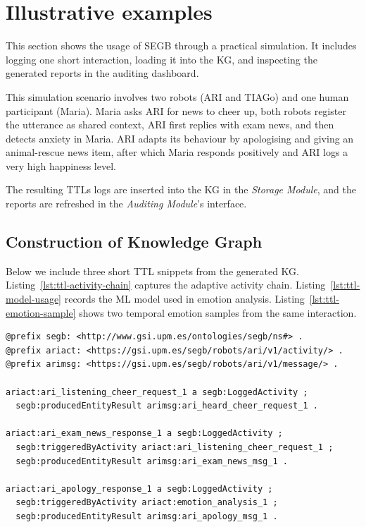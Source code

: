 \documentclass[preprint,12pt, a4paper]{elsarticle}
\begin{document}
\begin{itemize}
\end{itemize}


\section{Illustrative examples}

This section shows the usage of \ac{SEGB} through a practical simulation. It includes logging one short interaction, loading it into the \ac{KG}, and inspecting the generated reports in the auditing dashboard.

This simulation scenario involves two robots (ARI and TIAGo) and one human participant (Maria). Maria asks ARI for news to cheer up, both robots register the utterance as shared context, ARI first replies with exam news, and then detects anxiety in Maria. ARI adapts its behaviour by apologising and giving an animal-rescue news item, after which Maria responds positively and ARI logs a very high happiness level.

The resulting \acp{TTL} logs are inserted into the \ac{KG} in the \textit{Storage Module}, and the reports are refreshed in the \textit{Auditing Module}'s interface.

\subsection{Construction of Knowledge Graph}

Below we include three short \ac{TTL} snippets from the generated \ac{KG}. Listing~\ref{lst:ttl-activity-chain} captures the adaptive activity chain. Listing~\ref{lst:ttl-model-usage} records the \ac{ML} model used in emotion analysis. Listing~\ref{lst:ttl-emotion-sample} shows two temporal emotion samples from the same interaction.

\begin{lstlisting}[style=ttl,caption={Activity chain: adaptive response sequence},label={lst:ttl-activity-chain}]
@prefix segb: <http://www.gsi.upm.es/ontologies/segb/ns#> .
@prefix ariact: <https://gsi.upm.es/segb/robots/ari/v1/activity/> .
@prefix arimsg: <https://gsi.upm.es/segb/robots/ari/v1/message/> .

ariact:ari_listening_cheer_request_1 a segb:LoggedActivity ;
  segb:producedEntityResult arimsg:ari_heard_cheer_request_1 .

ariact:ari_exam_news_response_1 a segb:LoggedActivity ;
  segb:triggeredByActivity ariact:ari_listening_cheer_request_1 ;
  segb:producedEntityResult arimsg:ari_exam_news_msg_1 .

ariact:ari_apology_response_1 a segb:LoggedActivity ;
  segb:triggeredByActivity ariact:emotion_analysis_1 ;
  segb:producedEntityResult arimsg:ari_apology_msg_1 .
\end{lstlisting}
\end{document}
